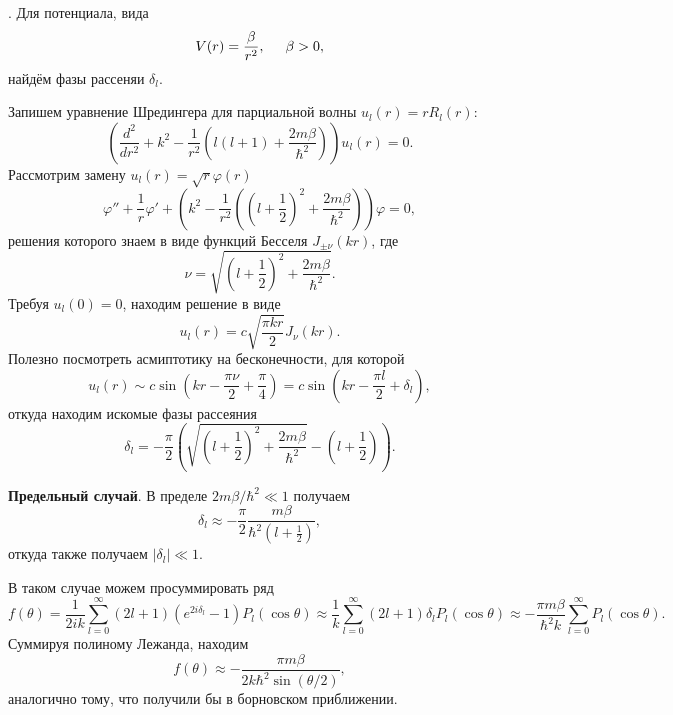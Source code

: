 
.
Для потенциала, вида
\begin{equation*}
	V(r) = \frac{\beta}{r^2},
	\hspace{5 mm} 
	\beta > 0,
\end{equation*}
найдём фазы рассеняи $\delta_l$. 

Запишем уравнение Шредингера для парциальной волны $u_l (r) = r R_l (r)$:
\begin{equation*}
	\left(
		\frac{d^2 }{d r^2} + k^2 - \frac{1}{r^2}\left(
			l(l+1) + \frac{2 m \beta}{\hbar^2}
		\right)
	\right) u_l (r) = 0.
\end{equation*}
Рассмотрим замену $u_l (r) = \sqrt{r} \varphi(r)$
\begin{equation*}
	\varphi'' + \frac{1}{r} \varphi' + \left(
		k^2 - \frac{1}{r^2}\left(
			\left(l +\frac{1}{2}\right)^2 + \frac{2 m \beta}{\hbar^2}
		\right)
	\right)\varphi = 0,
\end{equation*}
решения которого знаем в виде функций Бесселя $J_{\pm \nu} (kr)$, где
\begin{equation*}
	\nu = \sqrt{\left(l + \frac{1}{2}\right)^2 + \frac{2 m \beta}{\hbar^2}}.
\end{equation*}
Требуя $u_l (0) = 0$, находим решение в виде
\begin{equation*}
	u_l (r) = c \sqrt{\frac{\pi k r}{2}} J_\nu (kr).
\end{equation*}
Полезно посмотреть асмиптотику на бесконечности, для которой
\begin{equation*}
	u_l(r) \sim c \sin\left(kr - \frac{\pi \nu}{2} + \frac{\pi}{4}\right) = c \sin\left(kr - \frac{\pi l}{2} + \delta_l\right),
\end{equation*}
откуда находим искомые фазы рассеяния
\begin{equation*}
	\delta_l = - \frac{\pi}{2} \left(
		\sqrt{\left(l + \frac{1}{2}\right)^2 + \frac{2 m \beta}{\hbar^2}} - \left(l + \frac{1}{2}\right)
	\right).
\end{equation*}

\textbf{Предельный случай}. В пределе $2 m \beta / \hbar^2 \ll 1$ получаем
\begin{equation*}
	\delta_l \approx - \frac{\pi}{2} \frac{m \beta}{\hbar^2(l + \tfrac{1}{2})},
\end{equation*}
откуда также получаем $|\delta_l| \ll 1$. 

В таком случае можем просуммировать ряд
\begin{equation*}
	f(\theta) = \frac{1}{2 ik} \sum_{l=0}^{\infty} (2l+1) \left(e^{2 i \delta_l}- 1\right) P_l  (\cos \theta) \approx \frac{1}{k} \sum_{l=0}^{\infty} (2l+1) \delta_l P_l(\cos \theta) \approx	
	-\frac{\pi m \beta}{\hbar^2 k} \sum_{l=0}^{\infty} P_l(\cos \theta).
\end{equation*}
Суммируя полиному Лежанда, находим
\begin{equation*}
	f(\theta) \approx	 - \frac{\pi m \beta}{2 k \hbar^2 \sin(\theta/2)},
\end{equation*}
аналогично тому, что получили бы в борновском приближении.



